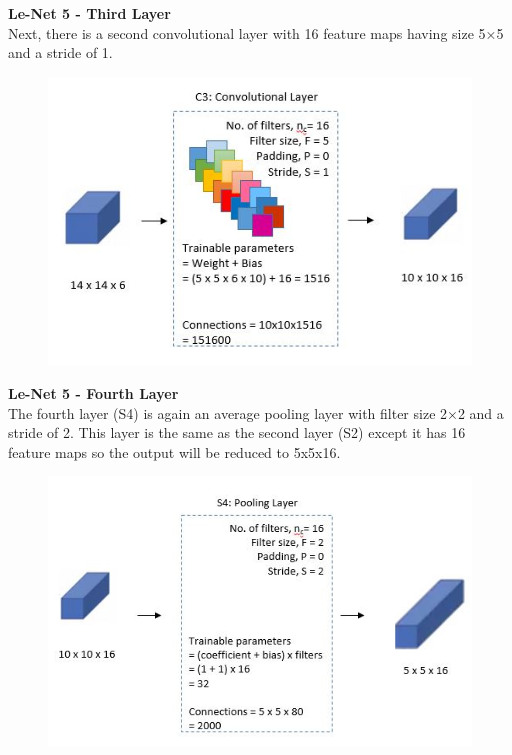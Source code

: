 \documentclass[10pt, compress]{beamer}
\begin{document}
\begin{frame}
  \vspace{0.6cm}
  \textbf{Le-Net 5 - Third Layer} \\
  Next, there is a second convolutional layer with 16 feature maps having size 5×5 and a stride of 1.
  \begin{figure}
    \includegraphics[width=.75\linewidth]{imgs/cnn/LeNet_Layer3}
  \end{figure}
\end{frame}

\begin{frame}
  \vspace{0.6cm}
  \textbf{Le-Net 5 - Fourth Layer} \\
  The fourth layer (S4) is again an average pooling layer with filter size 2×2 and a stride of 2. This layer is the same as the second layer (S2) except it has 16 feature maps so the output will be reduced to 5x5x16.
  \begin{figure}
    \includegraphics[width=.75\linewidth]{imgs/cnn/LeNet_Layer4}
  \end{figure}
\end{frame}
\end{document}
